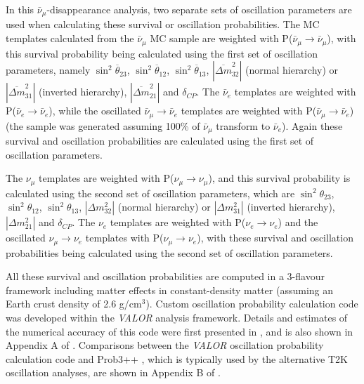 In this $\bar{\nu}_{\mu}$-disappearance analysis, two separate sets of oscillation parameters are used when calculating 
these survival or oscillation probabilities. The MC templates calculated from the $\bar{\nu}_{\mu}$ MC sample are weighted 
with P($\bar{\nu}_{\mu}\rightarrow\bar{\nu}_{\mu}$), with this survival probability being calculated using the first set of 
oscillation parameters, namely $\sin^{2}\overline{\theta}_{23}$, $\sin^{2}\overline{\theta}_{12}$, $\sin^{2}\overline{\theta}_{13}$, 
$|\overline{\Delta m}^{2}_{32}|$ (normal hierarchy) or $|\overline{\Delta m}^{2}_{31}|$ (inverted hierarchy), 
$|\overline{\Delta m}^{2}_{21}|$ and $\delta_{CP}$. The $\bar{\nu}_{e}$ templates are weighted with P($\bar{\nu}_{e}\rightarrow\bar{\nu}_{e}$), 
while the oscillated $\bar{\nu}_{\mu} \rightarrow \bar{\nu}_{e}$ templates are weighted with P($\bar{\nu}_{\mu}\rightarrow\bar{\nu}_{e}$) 
(the sample was generated assuming 100\% of $\bar{\nu}_{\mu}$ transform to $\bar{\nu}_{e}$). Again these survival and oscillation probabilities 
are calculated using the first set of oscillation parameters. 

The $\nu_{\mu}$ templates are weighted with P($\nu_{\mu}\rightarrow\nu_{\mu}$), and this survival probability is calculated using the 
second set of oscillation parameters, which are $\sin^{2}\theta_{23}$, $\sin^{2}\theta_{12}$,
$\sin^{2}\theta_{13}$, $|\Delta m^{2}_{32}|$ (normal hierarchy) or $|\Delta m^{2}_{31}|$ (inverted hierarchy),
$|\Delta m^{2}_{21}|$ and $\delta_{CP}$. The $\nu_{e}$ templates are weighted with P($\nu_{e}\rightarrow\nu_{e}$) and the 
oscillated $\nu_{\mu} \rightarrow \nu_{e}$ templates with P($\nu_{\mu}\rightarrow\nu_{e}$), with these survival and oscillation 
probabilities being calculated using the second set of oscillation parameters.

All these survival and oscillation probabilities are computed in a 3-flavour framework including matter effects in constant-density matter
(assuming an Earth crust density of 2.6 g/cm$^{3}$).
Custom oscillation probability calculation code was developed within the {\em VALOR} analysis framework.
Details and estimates of the numerical accuracy of this code were first presented in \cite{OurRun12DisappAnalysis3Flavour},
and is also shown in Appendix A of \cite{OurRun123DisappAnalysis3Flavour}.
Comparisons between the {\em VALOR} oscillation probability calculation code and Prob3++ \cite{Prob3}, 
which is typically used by the alternative T2K oscillation analyses, are shown in Appendix B of \cite{OurRun123DisappAnalysis3Flavour}.

